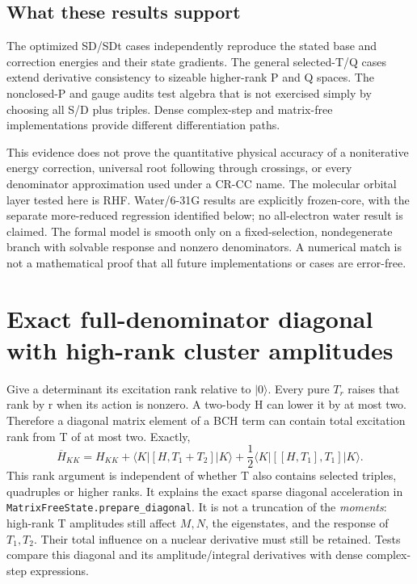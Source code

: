 \documentclass[11pt,letterpaper]{article}
\numberwithin{equation}{section}
\newcommand{\ket}[1]{\lvert #1\rangle}
\newcommand{\me}[3]{\langle #1\rvert #2\lvert #3\rangle}
\newcommand{\bH}{\overline H}
\begin{document}


\subsection{What these results support}
The optimized SD/SDt cases independently reproduce the stated base and
correction energies and their state gradients. The general selected-T/Q
cases extend derivative consistency to sizeable higher-rank P and Q spaces.
The nonclosed-P and gauge audits test algebra that is not exercised simply
by choosing all S/D plus triples. Dense complex-step and matrix-free
implementations provide different differentiation paths.

This evidence does not prove the quantitative physical accuracy of a
noniterative energy correction, universal root following through crossings,
or every denominator approximation used under a CR-CC name. The molecular
orbital layer tested here is RHF. Water/6-31G results are explicitly
frozen-core, with the separate more-reduced regression identified below;
no all-electron water result is claimed. The formal model is smooth only
on a fixed-selection, nondegenerate branch with solvable response and
nonzero denominators. A numerical match is not a mathematical proof that
all future implementations or cases are error-free.

\appendix
\clearpage
\section{Exact full-denominator diagonal with high-rank cluster amplitudes}
Give a determinant its excitation rank relative to $\ket{0}$. Every pure
$T_r$ raises that rank by r when its action is nonzero. A two-body H can
lower it by at most two. Therefore a diagonal matrix element of a BCH
term can contain total excitation rank from T of at most two. Exactly,
\begin{equation}
 \bH_{KK}=H_{KK}+\me{K}{[H,T_1+T_2]}{K}
                     +\frac12\me{K}{[[H,T_1],T_1]}{K}.
 \label{eq:exactdiagonal}
\end{equation}
This rank argument is independent of whether T also contains selected
triples, quadruples or higher ranks. It explains the exact sparse diagonal
acceleration in \texttt{MatrixFreeState.prepare\_diagonal}. It is not a
truncation of the \emph{moments}: high-rank T amplitudes still affect
$M,N$, the eigenstates, and the response of $T_1,T_2$. Their total influence
on a nuclear derivative must still be retained. Tests compare this diagonal
and its amplitude/integral derivatives with dense complex-step expressions.
\end{document}
